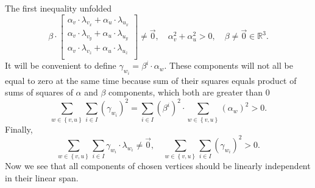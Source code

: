 The first inequality unfolded
\begin{equation*}
  \beta \cdot \begin{bmatrix}
    \alpha_v \cdot \lambda_{v_x} + \alpha_u \cdot \lambda_{u_x} \\
    \alpha_v \cdot \lambda_{v_y} + \alpha_u \cdot \lambda_{u_y} \\
    \alpha_v \cdot \lambda_{v_z} + \alpha_u \cdot \lambda_{u_z} \\
  \end{bmatrix}
  \neq \vec{0},
  \quad \alpha_v^2 + \alpha_u^2 > 0,
  \quad \beta \neq \vec{0} \in \mathbb{R}^3.
\end{equation*}
It will be convenient to define $\gamma_{w_i} = \beta^i \cdot \alpha_w$.
These components will not all be equal to zero at the same time because
sum of their squares equals product of sums of squares
of $\alpha$ and $\beta$ components, which both are greater than $0$
\begin{equation*}
  \sum_{w \in \left\{ v, u \right\}}
  \sum_{i \in I}
    \left( \gamma_{w_i} \right)^2
  =
  \sum_{i \in I}
    \left( \beta^i \right)^2 \cdot
  \sum_{w \in \left\{ v, u \right\}}
    \left( \alpha_w \right)^2
  > 0.
\end{equation*}
Finally,
\begin{equation}\label{eq:components:independent}
  \sum_{w \in \left\{ v, u \right\}}
  \sum_{i \in I}
    \gamma_{w_i} \cdot \lambda_{w_i}
  \neq \vec{0},
  \quad
    \sum_{w \in \left\{ v, u \right\}}
    \sum_{i \in I}
      \left( \gamma_{w_i} \right)^2 > 0.
\end{equation}
Now we see that all components of chosen vertices
should be linearly independent in their linear span.

